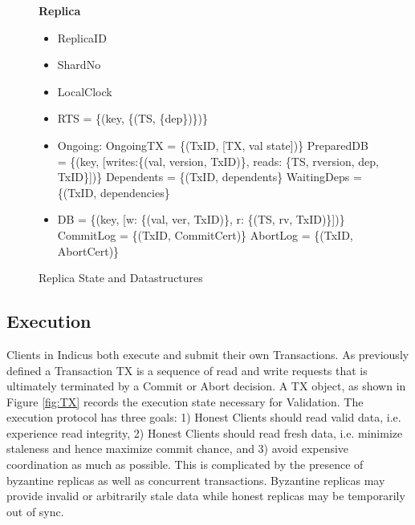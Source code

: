 \newcommand{\SubItem}[1]{
    {\setlength\itemindent{15pt} \item[-] #1}
}

\begin{figure}[t]
  \begin{mdframed}[roundcorner=10pt]
 	\textbf{Replica }
 	\begin{itemize}
 	\item ReplicaID
 	\item ShardNo
 	\item LocalClock
 	\item RTS = \{(key, \{(TS, \{dep\})\})\}
 	\item Ongoing:
 	\subitem OngoingTX = \{(TxID, [TX, val state])\}
 	\subitem PreparedDB = \{(key, [writes:\{(val, version, TxID)\},  reads: \{TS, rversion, dep, TxID\}])\}
 	\subitem Dependents = \{(TxID, dependents\}
 	\subitem WaitingDeps = \{(TxID, dependencies\}
 	\item DB = \{(key, [w: \{(val, ver, TxID)\}, r: \{(TS, rv, TxID)\}])\}
 	\subitem CommitLog = \{(TxID, CommitCert)\}
 	\subitem AbortLog = \{(TxID, AbortCert)\}
	 	
 	
 	\end{itemize}
  \end{mdframed}
  \caption{Replica State and Datastructures}
  \label{fig:RS}
\end{figure}



\subsection{Execution}
Clients in Indicus both execute and submit their own Transactions. As previously defined a Transaction TX is a sequence of read and write requests that is ultimately terminated by a Commit or Abort decision. A TX object, as shown in Figure \ref{fig:TX} records the execution state necessary for Validation. The execution protocol has three goals: 1) Honest Clients should read valid data, i.e. experience read integrity, 2) Honest Clients should read fresh data, i.e. minimize staleness and hence maximize commit chance, and 3) avoid expensive coordination as much as possible. This is complicated by the presence of byzantine replicas as well as concurrent transactions. Byzantine replicas may provide invalid or arbitrarily stale data while honest replicas may be temporarily out of sync.

